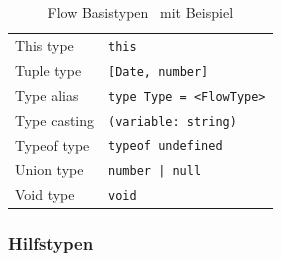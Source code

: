 \begin{table}[tbp]
\begin{tabularx}{\textwidth}{@{}ll@{}}
    This type                  & \texttt{this}                            \\
    Tuple type                 & \texttt{{[}Date, number{]}}              \\
    Type alias                 & \texttt{type Type = <{}FlowType>{}}      \\
    Type casting               & \texttt{(variable: string)}              \\
    Typeof type                & \texttt{typeof undefined}                \\
    Union type                 & \texttt{number | null}                   \\
    Void type                  & \texttt{void}                            \\
    \midrule
  \end{tabularx}
  \caption{Flow Basistypen~\autocite{FLOW_TYPE_ANNOTATIONS} mit Beispiel}
  \label{tab:flow-base-types}
\end{table}

\subsubsection{Hilfstypen}

